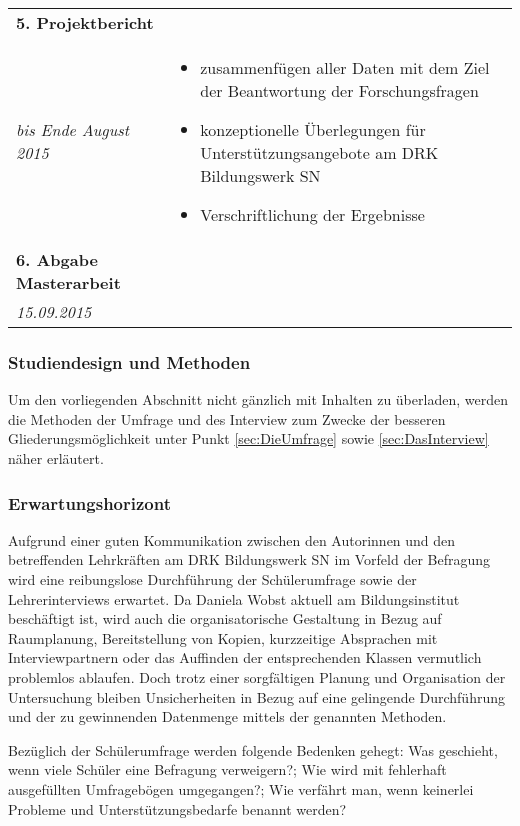 \begin{longtable}{l|p{9.8cm}}
	\textbf{5. Projektbericht} & \\*
	\emph{bis Ende August 2015} &
	\vspace*{-0.6cm}
	\begin{itemize}[nosep,topsep=-0.6cm]
		\item zusammenfügen aller Daten mit dem Ziel der Beantwortung der Forschungsfragen
		\item konzeptionelle Überlegungen für Unterstützungsangebote am DRK Bildungswerk SN
		\item Verschriftlichung der Ergebnisse
		\end{itemize} \\
	
	\textbf{6. Abgabe Masterarbeit} & \\*
	\emph{15.09.2015} & \\
	
\end{longtable}

\subsubsection{Studiendesign und Methoden}
\label{sec:StudiendesignUndMethoden}

Um den vorliegenden Abschnitt nicht gänzlich mit Inhalten zu überladen, werden die Methoden der Umfrage und des Interview zum Zwecke der besseren Gliederungsmöglichkeit unter Punkt \ref{sec:DieUmfrage} sowie \ref{sec:DasInterview} näher erläutert.

\subsubsection{Erwartungshorizont}
\label{sec:Erwartungshorizont}

Aufgrund einer guten Kommunikation zwischen den Autorinnen und den betreffenden Lehrkräften am DRK Bildungswerk SN im Vorfeld der Befragung wird eine reibungslose Durchführung der Schülerumfrage sowie der Lehrerinterviews erwartet. Da Daniela Wobst aktuell am Bildungsinstitut beschäftigt ist, wird auch die organisatorische Gestaltung in Bezug auf Raumplanung, Bereitstellung von Kopien, kurzzeitige Absprachen mit Interviewpartnern oder das Auffinden der entsprechenden Klassen vermutlich problemlos ablaufen. Doch trotz einer sorgfältigen Planung und Organisation der Untersuchung bleiben Unsicherheiten in Bezug auf eine gelingende Durchführung und der zu gewinnenden Datenmenge mittels der genannten Methoden.

Bezüglich der Schülerumfrage werden folgende Bedenken gehegt: Was geschieht, wenn viele Schüler eine Befragung verweigern?; Wie wird mit fehlerhaft ausgefüllten Umfragebögen umgegangen?; Wie verfährt man, wenn keinerlei Probleme und Unterstützungsbedarfe benannt werden?

